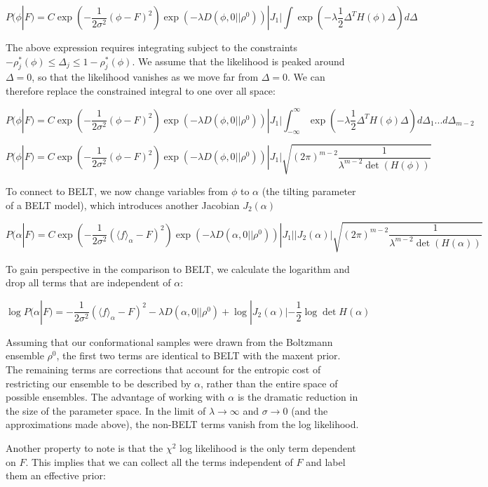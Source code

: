 \documentclass[12pt]{article}
\begin{document}
$$P(\phi | F) = C \exp(-\frac{1}{2\sigma^2} (\phi - F)^2) \exp(-\lambda  D(\phi, 0|| \rho^0)) |J_1|  \int   \exp(-\lambda \frac{1}{2} \Delta^T H(\phi) \Delta) d\Delta $$

The above expression requires integrating subject to the constraints $-\rho_j^*(\phi) \le \Delta_j \le 1 - \rho_j^*(\phi)$.  We assume that the likelihood is peaked around $\Delta=0$, so that the likelihood vanishes as we move far from $\Delta = 0$.  We can therefore replace the constrained integral to one over all space:

$$P(\phi | F) = C \exp(-\frac{1}{2\sigma^2} (\phi - F)^2) \exp(-\lambda  D(\phi, 0|| \rho^0)) |J_1|  \int_{-\infty}^\infty   \exp(-\lambda \frac{1}{2} \Delta^T H(\phi) \Delta) d\Delta_1 ... d\Delta_{m-2}$$


$$P(\phi | F) = C \exp(-\frac{1}{2\sigma^2} (\phi - F)^2) \exp(-\lambda  D(\phi, 0|| \rho^0)) |J_1|  \sqrt{(2\pi)^{m-2} \frac{1}{\lambda^{m-2} \det (H(\phi))}}  $$

To connect to BELT, we now change variables from $\phi$ to $\alpha$ (the tilting parameter of a BELT model), which introduces another Jacobian $J_2(\alpha)$

$$P(\alpha | F) = C \exp(-\frac{1}{2\sigma^2} (\langle f \rangle_\alpha - F)^2) \exp(-\lambda  D(\alpha, 0|| \rho^0)) |J_1|  |J_2(\alpha)|  \sqrt{(2\pi)^{m-2} \frac{1}{\lambda^{m-2} \det (H(\alpha))}}$$

To gain perspective in the comparison to BELT, we calculate the logarithm and drop all terms that are independent of $\alpha$:

$$\log P(\alpha | F) = -\frac{1}{2\sigma^2} (\langle f \rangle_\alpha - F)^2 -\lambda  D(\alpha, 0|| \rho^0) + \log |J_2(\alpha)| - \frac{1}{2} \log \det H(\alpha)$$

Assuming that our conformational samples were drawn from the Boltzmann ensemble $\rho^0$, the first two terms are identical to BELT with the maxent prior.  The remaining terms are corrections that account for the entropic cost of restricting our ensemble to be described by $\alpha$, rather than the entire space of possible ensembles.  The advantage of working with $\alpha$ is the dramatic reduction in the size of the parameter space.  In the limit of $\lambda \rightarrow \infty$ and $\sigma \rightarrow 0$ (and the approximations made above), the non-BELT terms vanish from the log likelihood.  

Another property to note is that the $\chi^2$ log likelihood is the only term dependent on $F$.  This implies that we can collect all the terms independent of $F$ and label them an effective prior:
\end{document}

